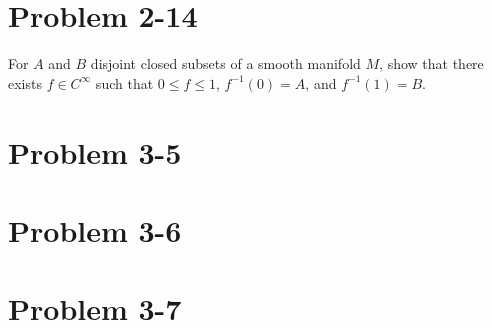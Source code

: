 \documentclass[fontsize=11pt]{scrartcl} %
\numberwithin{equation}{section} %
\numberwithin{figure}{section} %
\numberwithin{table}{section} %
\begin{document}
\section*{Problem 2-14}
For $A$ and $B$ disjoint closed subsets of a smooth manifold $M$, show that there
exists $f\in C^{\infty}$ such that $0\leq f\leq 1$, $f^{-1}(0) = A$, and $f^{-1}(1) = B$.
\section*{Problem 3-5}
\section*{Problem 3-6}
\section*{Problem 3-7}
\end{document}
